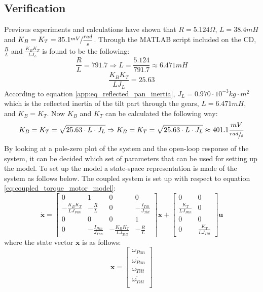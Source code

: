 \subsection{Verification}
Previous experiments and calculations have shown that $R = 5.124\Omega$, $L = 38.4mH$ and $K_B = K_T = 35.1 \sfrac{mV}{\dfrac{rad}{s}}$. Through the MATLAB script included on the CD, $\frac{R}{L}$ and $\frac{K_B K_T}{L J_L}$ is found to be the following:
\begin{equation}
	\frac{R}{L} = 791.7 \Rightarrow L = \frac{5.124}{791.7} \approx 6.471mH
\end{equation}
\begin{equation}
	\frac{K_B K_T}{L J_L} = 25.63\label{eq:constants}
\end{equation}
According to equation \ref{app:eq_reflected_pan_inertia}, $J_L = 0.970 \cdot 10^{-3} kg \cdot m^{2}$ which is the reflected inertia of the tilt part through the gears, $L = 6.471mH$, and $K_B = K_T$. Now $K_B$ and $K_T$ can be calculated the following way:
\begin{equation}
	K_B = K_T = \sqrt{25.63 \cdot L \cdot J_L} \Rightarrow K_B = K_T = \sqrt{25.63 \cdot L \cdot J_L} \approx 401.1 \frac{mV}{\sfrac{rad}{s}}
\end{equation}
By looking at a pole-zero plot of the system and the open-loop response of the system, it can be decided which set of parameters that can be used for setting up the model. To set up the model a state-space representation is made of the system as follows below. The coupled system is set up with respect to equation \ref{eq:coupled_torque_motor_model}:
\[
 \dot{\textbf{x}} =
 \begin{bmatrix}
   0 & 1 & 0 & 0\\
   - \frac{K_B K_T}{L J_{Pan}} & - \frac{R}{L} & 0 & - \frac{I_{Tilt}}{J_{Tilt}}\\
   0 & 0 & 0 & 1\\
   0 & - \frac{I_{Pan}}{J_{Pan}} & - \frac{K_B K_T}{L J_{Tilt}} & - \frac{R}{L}
 \end{bmatrix}
 \textbf{x} +
 \begin{bmatrix}
   0 & 0\\
   \frac{K_T}{L J_{Pan}} & 0\\
   0 & 0\\
   0 & \frac{K_T}{L J_{Tilt}}
 \end{bmatrix}
 \textbf{u}
\]
where the state vector $\textbf{x}$ is as follows:
\[
 \textbf{x} =
 \begin{bmatrix}
   \omega_{Pan}\\
   \dot{\omega_{Pan}}\\
   \omega_{Tilt}\\
   \dot{\omega_{Tilt}}\\
 \end{bmatrix}
\]
